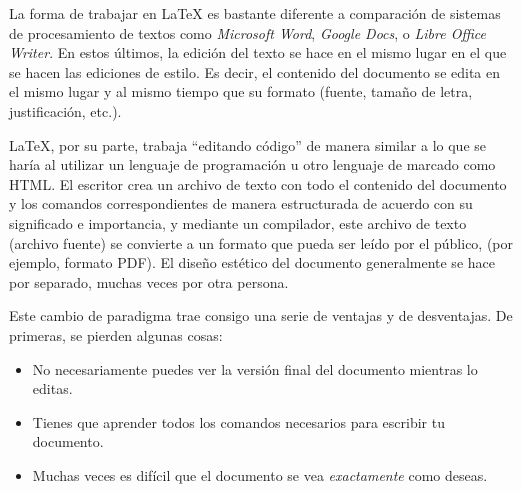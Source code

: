 \documentclass[12pt]{article}
\begin{document}
La forma de trabajar en \LaTeX{} es bastante diferente a comparación de
sistemas de procesamiento de textos como \textit{Microsoft Word},
\textit{Google Docs}, o \textit{Libre Office Writer}. En estos últimos, la
edición del texto se hace en el mismo lugar en el que se hacen las ediciones de
estilo. Es decir, el contenido del documento se edita en el mismo lugar y al
mismo tiempo que su formato (fuente, tamaño de letra, justificación, etc.). 

\LaTeX{}, por su parte, trabaja ``editando código'' de manera similar a lo que
se haría al utilizar un lenguaje de programación u otro lenguaje de marcado
como HTML. El escritor crea un archivo de texto con todo el contenido del
documento y los comandos correspondientes de manera estructurada de acuerdo con
su significado e importancia, y mediante un compilador, este archivo de texto
(archivo fuente) se convierte a un formato que pueda ser leído por el público,
(por ejemplo, formato PDF). El diseño estético del documento generalmente se
hace por separado, muchas veces por otra persona.

Este cambio de paradigma trae consigo una serie de ventajas y de desventajas.
De primeras, se pierden algunas cosas:
\begin{itemize}
    \item No necesariamente puedes ver la versión final del documento mientras
        lo editas.
    \item Tienes que aprender todos los comandos necesarios para escribir tu
        documento.
    \item Muchas veces es difícil que el documento se vea \emph{exactamente}
        como deseas.
\end{itemize}
\end{document}
